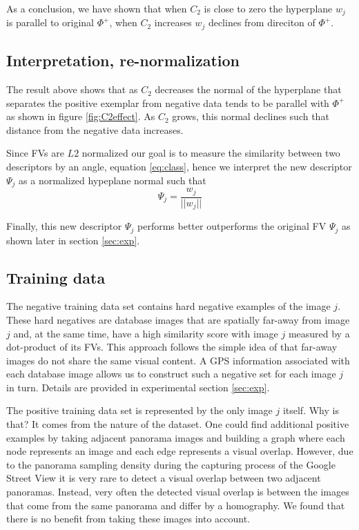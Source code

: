 \documentclass[table]{article} %
\begin{document}
		As a conclusion, we have shown that when $C_2$ is close to zero the hyperplane $w_j$ is parallel to original $\Phi^+$, when $C_2$ increases $w_j$ declines from direciton of $\Phi^+$.

	\subsection*{Interpretation, re-normalization} \vspace{-0.2cm}
	  	The result above shows that as $C_2$ decreases the normal of the hyperplane that separates the positive exemplar from negative data tends to be parallel with $\Phi^+$ as shown in figure \ref{fig:C2effect}. As $C_2$ grows, this normal declines such that distance from the negative data increases.

		Since FVs are $L2$ normalized our goal is to measure the similarity between two descriptors by an angle, equation \eqref{eq:class}, hence we interpret the new descriptor $\Psi_j$ as a normalized hypeplane normal such that
		  	\begin{equation}
		  		\Psi_j=\dfrac{w_j}{||w_j||}
		  	\end{equation}

        Finally, this new descriptor $\Psi_j$ performs better outperforms the original FV $\Psi_j$ as shown later in section \ref{sec:exp}.



    \subsection{Training data}
      	The negative training data set contains hard negative examples of the image $j$. These hard negatives are database images that are spatially far-away from image $j$ and, at the same time, have a high similarity score with image $j$ measured by a dot-product of its FVs. This approach follows the simple idea of \cite{Knopp2010} that far-away images do not share the same visual content. A GPS information associated with each database image allows us to construct such a negative set for each image $j$ in turn. Details are provided in experimental section \ref{sec:exp}.

      	The positive training data set is represented by the only image $j$ itself. Why is that? It comes from the nature of the dataset. One could find additional positive examples by taking adjacent panorama images and building a graph where each node represents an image and each edge represents a visual overlap. However, due to the panorama sampling density during the capturing process of the Google Street View it is very rare to detect a visual overlap between two adjacent panoramas. Instead, very often the detected visual overlap is between the images that come from the same panorama and differ by a homography. We found that there is no benefit from taking these images into account.
\end{document}
